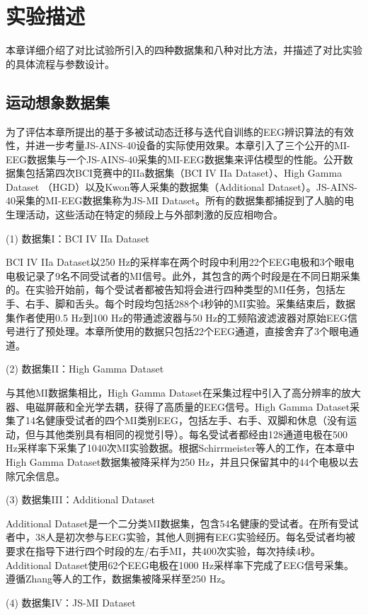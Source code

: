 \section{实验描述}
本章详细介绍了对比试验所引入的四种数据集和八种对比方法，并描述了对比实验的具体流程与参数设计。

\subsection{运动想象数据集}
为了评估本章所提出的基于多被试动态迁移与迭代自训练的EEG辨识算法的有效性，并进一步考量JS-AINS-40设备的实际使用效果。本章引入了三个公开的MI-EEG数据集与一个JS-AINS-40采集的MI-EEG数据集来评估模型的性能。公开数据集包括第四次BCI竞赛中的IIa数据集（BCI IV IIa Dataset）\cite{4-10}、High Gamma Dataset （HGD）\cite{4-11}以及Kwon等人采集的数据集（Additional Dataset）\cite{4-12}。JS-AINS-40采集的MI-EEG数据集称为JS-MI Dataset。所有的数据集都捕捉到了人脑的电生理活动，这些活动在特定的频段上与外部刺激的反应相吻合。

(1) 数据集I：BCI IV IIa Dataset

BCI IV IIa Dataset以250 Hz的采样率在两个时段中利用22个EEG电极和3个眼电电极记录了9名不同受试者的MI信号。此外，其包含的两个时段是在不同日期采集的。在实验开始前，每个受试者都被告知将会进行四种类型的MI任务，包括左手、右手、脚和舌头。每个时段均包括288个4秒钟的MI实验。采集结束后，数据集作者使用0.5 Hz到100 Hz的带通滤波器与50 Hz的工频陷波滤波器对原始EEG信号进行了预处理。本章所使用的数据只包括22个EEG通道，直接舍弃了3个眼电通道。

(2) 数据集II：High Gamma Dataset

与其他MI数据集相比，High Gamma Dataset在采集过程中引入了高分辨率的放大器、电磁屏蔽和全光学去耦，获得了高质量的EEG信号。High Gamma Dataset采集了14名健康受试者的四个MI类别EEG，包括左手、右手、双脚和休息（没有运动，但与其他类别具有相同的视觉引导）。每名受试者都经由128通道电极在500 Hz采样率下采集了1040次MI实验数据。根据Schirrmeister等人\cite{4-11}的工作，在本章中High Gamma Dataset数据集被降采样为250 Hz，并且只保留其中的44个电极以去除冗余信息。

(3) 数据集III：Additional Dataset

Additional Dataset是一个二分类MI数据集，包含54名健康的受试者。在所有受试者中，38人是初次参与EEG实验，其他人则拥有EEG实验经历。每名受试者均被要求在指导下进行四个时段的左/右手MI，共400次实验，每次持续4秒。Additional Dataset使用62个EEG电极在1000 Hz采样率下完成了EEG信号采集。遵循Zhang等人\cite{4-13}的工作，数据集被降采样至250 Hz。

(4) 数据集IV：JS-MI Dataset


